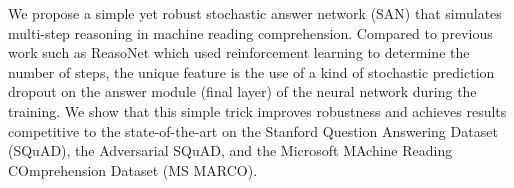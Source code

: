 We propose a simple yet robust stochastic answer network (SAN) that simulates multi-step reasoning in machine reading comprehension. Compared to previous work such as ReasoNet which used reinforcement learning to determine the number of steps, the unique feature is the use of a kind of stochastic prediction dropout on the answer module (final layer) of the neural network during the training. We show that this simple trick improves robustness and achieves results competitive to the state-of-the-art on the Stanford Question Answering Dataset (SQuAD), the Adversarial SQuAD, and the Microsoft MAchine Reading COmprehension Dataset (MS MARCO).

